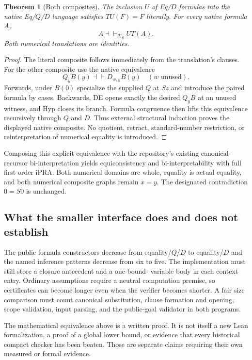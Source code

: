 \documentclass[11pt,letterpaper]{article}
\newtheorem{theorem}{Theorem}[section]
\theoremstyle{definition}\newtheorem{definition}[theorem]{Definition}
\begin{document}
\begin{theorem}[Both composites]
The inclusion $U$ of Eq/$D$ formulas into the native Eq/$Q$/$D$ language
satisfies $TU(F)=F$ literally. For every native formula $A$,
\[
 A\dashv\vdash_{\mathcal K_6}UT(A).
\]
Both numerical translations are identities.
\end{theorem}
\begin{proof}
The literal composite follows immediately from the translation's clauses.
For the other composite use the native equivalence
\[
 Q_yB(y)\dashv\vdash D_{w,y}B(y)\quad(w\text{ unused}).
\]
Forwards, under $B(0)$ specialize the supplied $Q$ at $Sz$ and introduce
the paired formula by cases. Backwards, DE opens exactly the desired
$Q_yB$ at an unused witness, and Hyp closes its branch. Formula congruence
then lifts this equivalence recursively through $Q$ and $D$. Thus
external structural induction proves the displayed native composite.
No quotient, retract, standard-number restriction, or reinterpretation
of numerical equality is introduced.
\end{proof}

Composing this explicit equivalence with the repository's existing
canonical-recursor bi-interpretation yields equiconsistency and
bi-interpretability with full first-order iPRA. Both numerical domains
are whole, equality is actual equality, and both numerical composite
graphs remain $x=y$. The designated contradiction $0=S0$ is unchanged.

\subsection{What the smaller interface does and does not establish}

The public formula constructors decrease from equality/$Q$/$D$ to
equality/$D$ and the named inference patterns decrease from six to five.
The implementation must still store a closure antecedent and a one-bound-
variable body in each context entry. Ordinary assumptions require a
neutral computation premise, so certificates can become longer even
when the verifier becomes shorter. A fair size comparison must count
canonical substitution, clause formation and opening, scope validation,
input parsing, and the public-goal validator in both programs.

The mathematical equivalence above is a written proof. It is not itself
a new Lean formalization, a proof of a global lower bound, or evidence
that every historical compact checker has been beaten. Those are
separate claims requiring their own measured or formal evidence.
\end{document}
